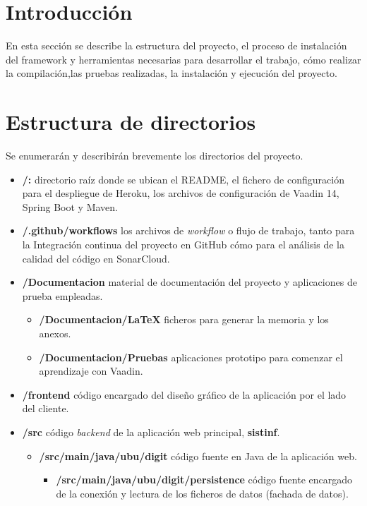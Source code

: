 
\section{Introducción}
En esta sección se describe la estructura del proyecto, el proceso de instalación del framework y herramientas necesarias para desarrollar el trabajo, cómo realizar la compilación,las pruebas realizadas, la instalación y ejecución del proyecto.

\section{Estructura de directorios}
Se enumerarán y describirán brevemente los directorios del proyecto.

\begin{itemize}
	\item \textbf{/:} directorio raíz donde se ubican el README, el fichero de configuración para el despliegue de Heroku, los archivos de configuración de Vaadin 14, Spring Boot y Maven. 
	\item \textbf{/.github/workflows} los archivos de \textit{workflow} o flujo de trabajo, tanto para la Integración continua del proyecto en GitHub cómo para el análisis de la calidad del código en SonarCloud.
	\item \textbf{/Documentacion} material de documentación del proyecto y aplicaciones de prueba empleadas.
		\begin{itemize}
			\tightlist
			\item \textbf{/Documentacion/LaTeX} ficheros para generar la memoria y los anexos.
			\item \textbf{/Documentacion/Pruebas} aplicaciones prototipo para comenzar el aprendizaje con Vaadin.
		\end{itemize}
	\item \textbf{/frontend} código encargado del diseño gráfico de la aplicación por el lado del cliente.
	\item \textbf{/src} código \textit{backend} de la aplicación web principal, \textbf{sistinf}.
	\begin{itemize}
		\tightlist
		\item \textbf{/src/main/java/ubu/digit} código fuente en Java de la aplicación web.
			\begin{itemize}
				\item \textbf{/src/main/java/ubu/digit/persistence} código fuente encargado de la conexión y lectura de los ficheros de datos (fachada de datos).

\end{itemize}
\end{itemize}
\end{itemize}

